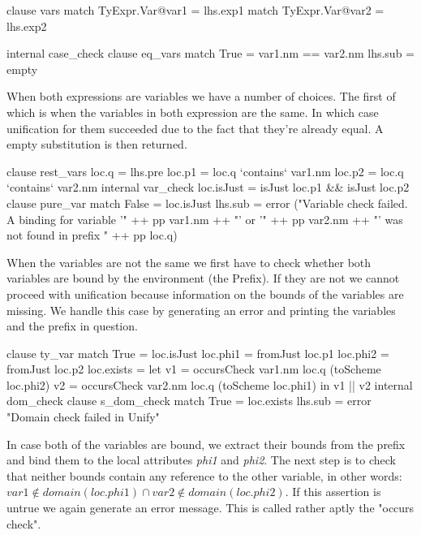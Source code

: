 \begin{code}
                     clause vars
                       match TyExpr.Var@var1 = lhs.exp1
                       match TyExpr.Var@var2 = lhs.exp2
                       
                       internal case_check
                         clause eq_vars
                           match True = var1.nm == var2.nm
                           lhs.sub = empty
\end{code}
When both expressions are variables we have a number of choices. The first of which is when the variables in both expression are the same. In which case unification for them succeeded due to the fact that they're already equal. A empty substitution is then returned.

\begin{code}
                         clause rest_vars
                           loc.q  = lhs.pre
                           loc.p1 = loc.q `contains` var1.nm
                           loc.p2 = loc.q `contains` var2.nm
                           internal var_check
                             loc.isJust    = isJust loc.p1 && isJust loc.p2
                             clause pure_var
                               match False = loc.isJust
                               lhs.sub = error ("Variable check failed. A binding for variable '" ++ pp var1.nm ++ "' or '" ++ pp var2.nm ++ "' was not found in prefix " ++ pp loc.q)
\end{code}
When the variables are not the same we first have to check whether both variables are bound by the environment (the Prefix). If they are not we cannot proceed with unification because information on the bounds of the variables are missing. We handle this case by generating an error and printing the variables and the prefix in question.

\begin{code} 
                             clause ty_var
                               match True  = loc.isJust
                               loc.phi1 = fromJust loc.p1
                               loc.phi2 = fromJust loc.p2
                               loc.exists = let v1 = occursCheck var1.nm loc.q (toScheme loc.phi2)
                                                v2 = occursCheck var2.nm loc.q (toScheme loc.phi1)
                                            in v1 || v2
                               internal dom_check
                                 clause s_dom_check
                                   match True  = loc.exists
                                   lhs.sub = error "Domain check failed in Unify"
\end{code}
In case both of the variables are bound, we extract their bounds from the prefix and bind them to the local attributes \emph{phi1} and \emph{phi2}. The next step is to check that neither bounds contain any reference to the other variable, in other words: $var1 \notin domain(loc.phi1) \cap var2 \notin domain(loc.phi2)$. If this assertion is untrue we again generate an error message. This is called rather aptly the "occurs check".

